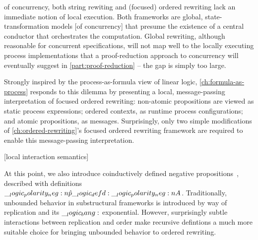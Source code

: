 

 of concurrency, both string rewiting and (focused) ordered rewriting lack an immediate notion of local execution.
Both frameworks are global, state-transformation models [of concurrency] that presume the existence of a central conductor that orchestrates the computation.
Global rewriting, although reasonable for concurrent specifications, will not map well to the locally executing process implementations that a proof-reduction approach to concurrency will eventually suggest in \cref{part:proof-reduction} -- the gap is simply too large.

Strongly inspired by the process-as-formula view of linear logic\autocites{Miller:ELP92}{Cervesato+Scedrov:IC09}, \cref{ch:formula-as-process} responds to this dilemma by presenting a local, message-passing interpretation of focused ordered rewriting:
non-atomic propositions are viewed as static process expressions; ordered contexts, as runtime process configurations; and atomic propositions, as messages.
Surprisingly, only two simple modifications of \cref{ch:ordered-rewriting}'s focused ordered rewriting framework are required to enable this message-passing interpretation.


[local interaction semantics]

At this point, we also introduce coinductively defined negative propositions~, described with definitions $\__logic_polarity_neg:n {\hat{p}} \__logic_defd: \__logic_polarity_neg:n {A}$.
Traditionally, unbounded behavior in substructural frameworks is introduced by way of replication and its $\__logic_bang:$ exponential.
However, surprisingly subtle interactions between replication and order make recursive defintions a much more suitable choice for bringing unbounded behavior to ordered rewriting.


